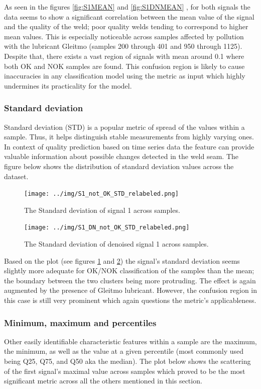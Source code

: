 \documentclass[12pt]{report}
\begin{document}
As seen in the figures \ref{fig:S1MEAN} and \ref{fig:S1DNMEAN} , for both signals the data seems to show a significant correlation between the mean value of the signal and the quality of the weld; poor quality welds tending to correspond to higher mean values. This is especially noticeable across samples affected by pollution with the lubricant Gleitmo (samples 200 through 401 and 950 through 1125). Despite that, there exists a vast region of signals with mean around 0.1 where both OK and NOK samples are found. This confusion region is likely to cause inaccuracies in any classification model using the metric as input which highly undermines its practicality for the model.

\subsubsection{Standard deviation}

Standard deviation (STD) is a popular metric of spread of the values within a sample. Thus, it helps distinguish stable measurements from highly varying ones. In context of quality prediction based on time series data the feature can provide valuable information about possible changes detected in the weld seam. The figure below shows the distribution of standard deviation values across the dataset.

\begin{figure}[H]
	\texttt{[image: ../img/S1\_not\_OK\_STD\_relabeled.png]}
	\caption{The Standard deviation of signal 1 across samples.}
	\label{fig:S1STD}
\end{figure}
\begin{figure}[H]
	\texttt{[image: ../img/S1\_DN\_not\_OK\_STD\_relabeled.png]}
	\caption{The Standard deviation of denoised signal 1 across samples.}
	\label{fig:S1DNSTD}
\end{figure}

Based on the plot (see figures \ref{fig:S1STD} and \ref{fig:S1DNSTD}) the signal’s standard deviation seems slightly more adequate for OK/NOK classification of the samples than the mean; the boundary between the two clusters being more protruding. The effect is again augmented by the presence of Gleitmo lubricant. However, the confusion region in this case is still very prominent which again questions the metric’s applicableness.

\subsubsection{Minimum, maximum and percentiles}
Other easily identifiable characteristic features within a sample are the maximum, the minimum, as well as the value at a given percentile (most commonly used being Q25, Q75, and Q50 aka the median). The plot below shows the scattering of the first signal’s maximal value across samples which proved to be the most significant metric across all the others mentioned in this section.
\end{document}
